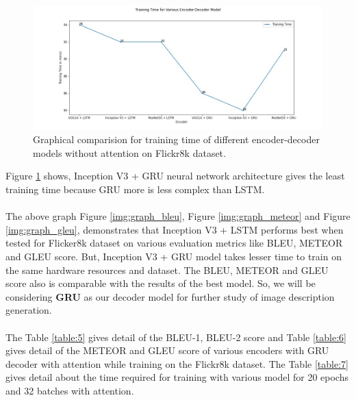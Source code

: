 \begin{figure}[ht!]
    \includegraphics[scale=0.5]{chapters/5/intfig/training_time.jpg}\hfill
    \caption{Graphical comparision for training time of different encoder-decoder models without attention on Flickr8k dataset.}
    \label{img:graph_tt}
\end{figure}
\noindent Figure \ref{img:graph_tt} shows, Inception V3 + GRU neural network architecture gives the least training time because GRU more is less complex than LSTM. \\ \\ 
\noindent The above graph Figure \ref{img:graph_bleu}, Figure \ref{img:graph_meteor} and Figure \ref{img:graph_gleu}, demonstrates that Inception V3 + LSTM performs best when tested for Flicker8k dataset on various evaluation metrics like BLEU, METEOR and GLEU score. But, Inception V3 + GRU model takes lesser time to train on the same hardware resources and dataset. The BLEU, METEOR and GLEU score also is comparable with the results of the best model. So, we will be considering \textbf{GRU} as our decoder model for further study of image description generation. \\ \\
\noindent The Table \ref{table:5} gives detail of the BLEU-1, BLEU-2 score and Table \ref{table:6} gives detail of the METEOR and GLEU score of various encoders with GRU decoder with attention while training on the Flickr8k dataset. The Table \ref{table:7} gives detail about the time required for training with various model for 20 epochs and 32 batches with attention.

